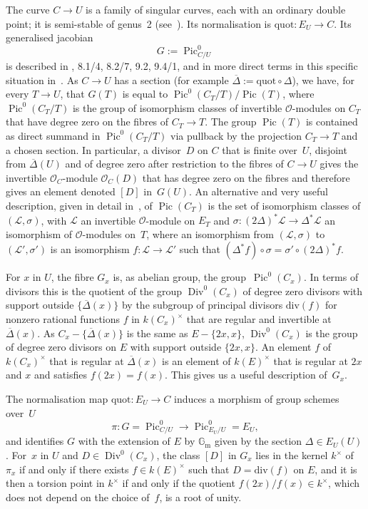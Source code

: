\documentclass[JEP,XML,SOM,Unicode,NoFloatCountersInSection]{cedram}
\let\mathcal\mathscr
\theoremstyle{plain}
\theoremstyle{definition}
\numberwithin{equation}{subsection}
\let\ol\overline
\renewcommand{\G}{\mathbb G}
\newcommand{\calL}{\mathcal{L}}
\newcommand{\calO}{\mathcal{O}}
\newcommand{\divisor}{\mathrm{div}}
\newcommand{\Gm}{\G_{\mathrm{m}}}
\newcommand{\quot}{\mathrm{quot}}
\DeclareMathOperator{\Div}{Div}
\DeclareMathOperator{\Pic}{Pic}
\begin{document}
The curve $C\to U$ is a family of singular curves, each with an
ordinary double point; it is semi-stable of genus~2
(see~\cite[9.2/6, 9.2/8]{BLR}). Its normalisation is
$\quot\colon E_U \to C$. Its generalised jacobian
\[
G:=\Pic^0_{C/U}
\]
is described in \cite{BLR}, 8.1/4, 8.2/7, 9.2, 9.4/1, and
in more direct terms in this specific situation in~\cite{Howe}. As
$C\to U$ has a section (for example $\ol{\Delta}:=\quot\circ \Delta$),
we have, for every $T\to U$, that $G(T)$ is equal to $\Pic^0(C_T/T)/\Pic(T)$, where
$\Pic^0(C_T/T)$ is the group of isomorphism classes of invertible
$\calO$-modules on $C_T$ that have degree zero on the fibres
of $C_T\to T$. The group $\Pic(T)$ is contained as direct
summand in $\Pic^0(C_T/T)$ via pullback by the projection
$C_T\to T$ and a chosen section. In particular, a divisor~$D$
on $C$ that is finite over~$U$, disjoint from $\ol{\Delta}(U)$ and of
degree zero after restriction to the fibres of $C\to U$ gives the
invertible $\calO_C$-module $\calO_C(D)$ that has degree zero on the
fibres and therefore gives an element denoted $[D]$ in~$G(U)$. An
alternative and very useful description, given in detail
in~\cite{Howe}, of $\Pic(C_T)$ is the set of isomorphism
classes of $(\calL,\sigma)$, with $\calL$ an invertible $\calO$-module
on $E_T$ and $\sigma\colon (2\Delta)^*\calL\to \Delta^*\calL$
an isomorphism of $\calO$-modules on~$T$, where an isomorphism from
$(\calL,\sigma)$ to $(\calL',\sigma')$ is an isomorphism
$f\colon\calL\to\calL'$ such that $(\Delta^*f)\circ\sigma =
\sigma'\circ (2\Delta)^*f$.

For $x$ in $U$, the fibre $G_x$ is, as abelian group, the
group~$\Pic^0(C_x)$. In terms of divisors this is the quotient of the
group $\Div^0(C_x)$ of degree zero divisors with support outside
$\{\ol{\Delta}(x)\}$ by the subgroup of principal divisors
$\divisor(f)$ for nonzero rational functions $f$ in $k(C_x)^\times$
that are regular and invertible at~$\ol{\Delta}(x)$. As
$C_x-\{\ol{\Delta}(x)\}$ is the same as $E-\{2x,x\}$, $\Div^0(C_x)$ is
the group of degree zero divisors on $E$ with support outside
$\{2x,x\}$. An element $f$ of $k(C_x)^\times$ that is regular at
$\ol{\Delta}(x)$ is an element of $k(E)^\times$ that is regular at
$2x$ and $x$ and satisfies $f(2x)=f(x)$. This gives us a useful
description of~$G_x$.

The normalisation map $\quot\colon E_U\to C$ induces a morphism of
group schemes over~$U$\vspace*{-3pt}
\[
\pi\colon G = \Pic^0_{C/U} \to \Pic^0_{E_U/U} = E_U,
\]
and identifies $G$ with the extension of $E$ by $\Gm$ given by the
section $\Delta\in E_U(U)$. For~$x$ in $U$ and $D \in
\Div^0(C_x)$, the class $[D]$ in $G_x$ lies in the kernel
$k^\times$ of $\pi_x$ if and only if there exists $f \in
k(E)^\times$ such that $D=\divisor(f)$ on $E$, and it
is then a torsion point in $k^\times$ if and only if the quotient
$f(2x)/f(x) \in k^\times$, which does not depend on the
choice of~$f$, is a root of unity.
\end{document}
